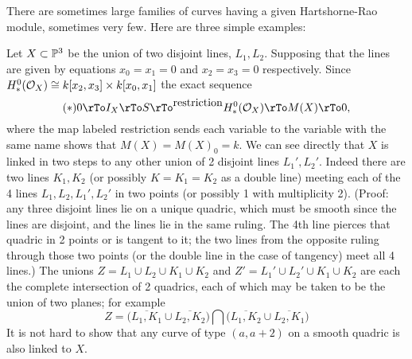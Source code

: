 There are sometimes large families of curves having a given Hartshorne-Rao module, sometimes very few. Here are three simple examples:

\begin{example}\label{2 lines}
 Let $X\subset {\mathbb P}^3$ be the union of two disjoint lines, $L_1,L_2$. Supposing that the lines are given by equations $x_0=x_1=0$ and $x_2=x_3=0$ respectively. Since $H^0_*({\mathcal O}_X) \cong k[x_2,x_3] \times k[x_0,x_1]$ the exact sequence
 $$
 (*)  0\rTo I_X \rTo S \rTo^{\hbox{restriction}} H^0_*(\sO_X) \rTo M(X) \rTo  0,
 $$
where the map labeled restriction sends each variable to the variable with the same name shows that $M(X) = M(X)_0 =k$.
We can see directly that $X$ is linked in two steps to any other union of 2 disjoint lines $L_1',L_2'$. Indeed there are two lines $K_1,K_2$ (or possibly $K = K_1 = K_2$ as a double line) meeting each of the 4 lines $L_1,L_2,L_1', L_2'$ in two points (or possibly 1 with multiplicity 2). (Proof: any three disjoint lines lie on a  unique quadric, which must be smooth since the lines are disjoint, and the lines lie in the same ruling. The 4th line pierces that quadric in 2 points or is tangent to it; the two lines from the opposite ruling through those two points (or the double line in the case of tangency) meet all 4 lines.) The unions $Z = L_1\cup L_2\cup K_1\cup K_2$ and 
$Z' = L_1'\cup L_2'\cup K_1\cup K_{2}$ are each the complete intersection of 2 quadrics, each of which may be taken to be the union of two planes; for example 
$$
Z = \bigl(\overline{L_1,K_1} \cup \overline{L_2, K_2}\bigr)\bigcap\bigl( \overline{L_1,K_2} \cup \overline{L_2, K_1}\bigr)
$$
It is not hard to show that any curve of type $(a,a+2)$ on a smooth quadric is also linked to $X$.\end{example}

